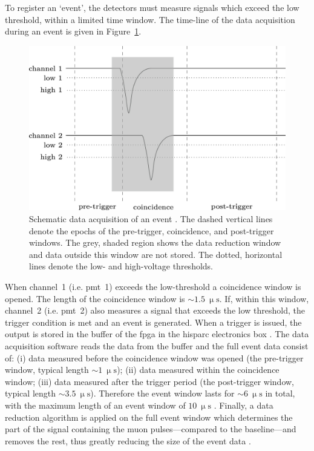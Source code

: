 To register an `event', the detectors must measure signals which exceed the low threshold, within a limited time window. The time-line of the data acquisition during an event is given in Figure~\ref{fig:HS_windows}.

\begin{figure}[ht!]
	\centering
	\includegraphics[width=0.9\columnwidth]{HS_pulses.jpg}
	\caption{Schematic data acquisition of an event \citep{fokkema_hisparc_2012}. The dashed vertical lines denote the epochs of the pre-trigger, coincidence, and post-trigger windows. The grey, shaded region shows the data reduction window and data outside this window are not stored. The dotted, horizontal lines denote the low- and high-voltage thresholds.}
	\label{fig:HS_windows}
\end{figure}

When channel~1 (i.e. \gls{pmt}~1) exceeds the low-threshold a coincidence window is opened. The length of the coincidence window is $\sim1.5~\upmu\mathrm{s}$. If, within this window, channel~2 (i.e. \gls{pmt}~2) also measures a signal that exceeds the low threshold, the trigger condition is met and an event is generated. When a trigger is issued, the output is stored in the buffer of the \gls{fpga} in the \gls{hisparc} electronics box \citep{fokkema_hisparc_2012}. The data acquisition software reads the data from the buffer and the full event data consist of: (i) data measured before the coincidence window was opened (the pre-trigger window, typical length $\sim1~\upmu\mathrm{s}$); (ii) data measured within the coincidence window; (iii) data measured after the trigger period (the post-trigger window, typical length $\sim3.5~\upmu\mathrm{s}$). Therefore the event window lasts for $\sim6~\upmu\mathrm{s}$ in total, with the maximum length of an event window of $10~\upmu\mathrm{s}$ \citep{van_dam_hisparc_2020}. Finally, a data reduction algorithm is applied on the full event window which determines the part of the signal containing the muon pulses---compared to the baseline---and removes the rest, thus greatly reducing the size of the event data \citep{fokkema_hisparc_2012}.


